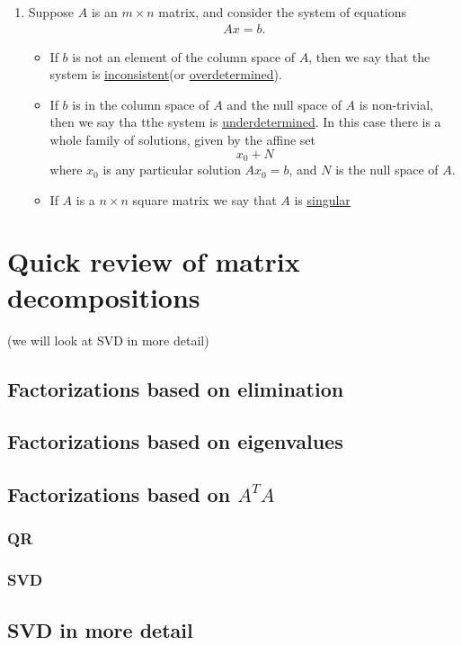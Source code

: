 \begin{enumerate}
\item Suppose $A$ is an $m\times n$ matrix, and consider the system of equations 
    \begin{align*}
        Ax = b.
    \end{align*}
    \begin{itemize}
        \item If $b$ is not an element of the column space of $A$, then we say that the system is \underline{inconsistent}(or \underline{overdetermined}). 
        \item If $b$ is in the column space of $A$ and the null space of $A$ is non-trivial, then we say tha tthe system is \underline{underdetermined}. In this case there is a whole family of solutions, given by the affine set
            $$x_0 + N$$
        where $x_0$ is any particular solution $Ax_0 = b$, and $N$ is the null space of $A$. 
        \item If $A$ is a $n\times n$ square matrix we say that $A$ is \underline{singular}
    \end{itemize}
\end{enumerate}

\newpage
\section{Quick review of matrix decompositions}
(we will look at SVD in more detail)

\subsection{Factorizations based on elimination}

\subsection{Factorizations based on eigenvalues}

\subsection{Factorizations based on $A^TA$}

\subsubsection{QR}

\subsubsection{SVD}

\subsection{SVD in more detail}